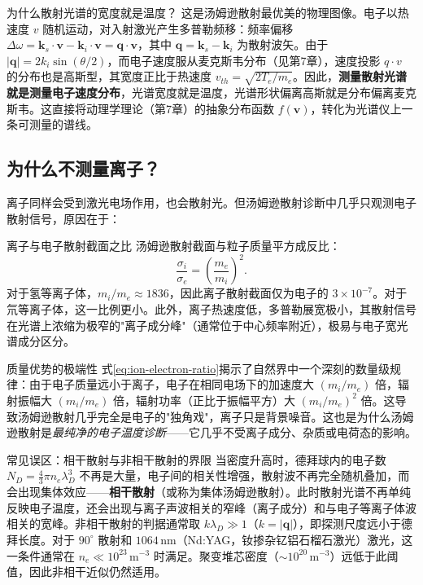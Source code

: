 \documentclass[12pt,a4paper,openany,oneside]{book}
\newcommand{\vect}[1]{\bm{#1}}
\begin{document}
\begin{insight}{为什么散射光谱的宽度就是温度？}{}
这是汤姆逊散射最优美的物理图像。电子以热速度 $v$ 随机运动，对入射激光产生多普勒频移：频率偏移 $\Delta\omega = \vect{k}_s\cdot\vect{v} - \vect{k}_i\cdot\vect{v} = \vect{q}\cdot\vect{v}$，其中 $\vect{q} = \vect{k}_s - \vect{k}_i$ 为散射波矢。由于 $|\vect{q}| = 2k_i\sin(\theta/2)$，而电子速度服从麦克斯韦分布（见第7章），速度投影 $q\cdot v$ 的分布也是高斯型，其宽度正比于热速度 $v_{th} = \sqrt{2T_e/m_e}$。因此，\textbf{测量散射光谱就是测量电子速度分布}，光谱宽度就是温度，光谱形状偏离高斯就是分布偏离麦克斯韦。这直接将动理学理论（第7章）的抽象分布函数 $f(\vect{v})$，转化为光谱仪上一条可测量的谱线。
\end{insight}

\subsection{为什么不测量离子？}

离子同样会受到激光电场作用，也会散射光。但汤姆逊散射诊断中几乎只观测电子散射信号，原因在于：

\begin{corollary}{离子与电子散射截面之比}{}{}
汤姆逊散射截面与粒子质量平方成反比：
\begin{equation}
\frac{\sigma_i}{\sigma_e} = \left(\frac{m_e}{m_i}\right)^2.
\label{eq:ion-electron-ratio}
\end{equation}
对于氢等离子体，$m_i/m_e \approx 1836$，因此离子散射截面仅为电子的 $3\times 10^{-7}$。对于氘等离子体，这一比例更小。此外，离子热速度低，多普勒展宽极小，其散射信号在光谱上浓缩为极窄的"离子成分峰"（通常位于中心频率附近），极易与电子宽光谱成分区分。
\end{corollary}

\begin{insight}{质量优势的极端性}{}
式\eqref{eq:ion-electron-ratio}揭示了自然界中一个深刻的数量级规律：由于电子质量远小于离子，电子在相同电场下的加速度大 $(m_i/m_e)$ 倍，辐射振幅大 $(m_i/m_e)$ 倍，辐射功率（正比于振幅平方）大 $(m_i/m_e)^2$ 倍。这导致汤姆逊散射几乎完全是电子的"独角戏"，离子只是背景噪音。这也是为什么汤姆逊散射是\emph{最纯净的电子温度诊断}——它几乎不受离子成分、杂质或电荷态的影响。
\end{insight}

\begin{warning}{常见误区：相干散射与非相干散射的界限}{}
当密度升高时，德拜球内的电子数 $N_D = \tfrac{4}{3}\pi n_e \lambda_D^3$ 不再是大量，电子间的相关性增强，散射波不再完全随机叠加，而会出现集体效应——\textbf{相干散射}（或称为集体汤姆逊散射）。此时散射光谱不再单纯反映电子温度，还会出现与离子声波相关的窄峰（离子成分）和与电子等离子体波相关的宽峰。非相干散射的判据通常取 $k\lambda_D \gg 1$（$k = |\vect{q}|$），即探测尺度远小于德拜长度。对于 $90^\circ$ 散射和 $1064\,\mathrm{nm}$（Nd:YAG，钕掺杂钇铝石榴石激光）激光，这一条件通常在 $n_e \ll 10^{23}\,\mathrm{m}^{-3}$ 时满足。聚变堆芯密度（$\sim 10^{20}\,\mathrm{m}^{-3}$）远低于此阈值，因此非相干近似仍然适用。
\end{warning}
\end{document}
